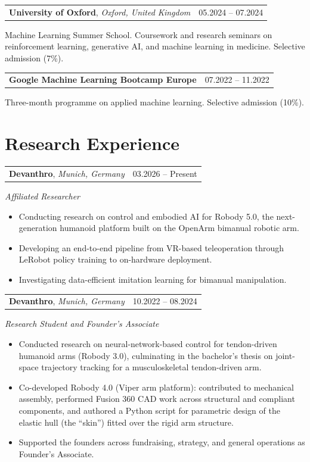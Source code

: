 \documentclass[11pt,a4paper]{article}
\makeatletter
\newcommand{\cventry}[3]{%
    \begin{tabularx}{\textwidth}{@{}Xr@{}}
        \textbf{#1}, \textit{#2} & #3 \\
    \end{tabularx}%
    \vspace{-0.35em}\par%
}
\newcommand{\cvitem}[2]{%
    \begin{tabularx}{\textwidth}{@{}Xr@{}}
        \textbf{#1} & #2 \\
    \end{tabularx}%
    \vspace{-0.35em}\par%
}
\makeatother
\begin{document}
\vspace{0.25em}
\cventry{University of Oxford}{Oxford, United Kingdom}{05.2024 -- 07.2024}
Machine Learning Summer School. Coursework and research seminars on reinforcement learning, generative AI, and machine learning in medicine. Selective admission (7\%).

\vspace{0.25em}
\cvitem{Google Machine Learning Bootcamp Europe}{07.2022 -- 11.2022}
Three-month programme on applied machine learning. Selective admission (10\%).

\section*{Research Experience}

\cventry{Devanthro}{Munich, Germany}{03.2026 -- Present}
\textit{Affiliated Researcher}
\begin{itemize}
    \item Conducting research on control and embodied AI for Robody 5.0, the next-generation humanoid platform built on the OpenArm bimanual robotic arm.
    \item Developing an end-to-end pipeline from VR-based teleoperation through LeRobot policy training to on-hardware deployment.
    \item Investigating data-efficient imitation learning for bimanual manipulation.
\end{itemize}

\vspace{0.25em}
\cventry{Devanthro}{Munich, Germany}{10.2022 -- 08.2024}
\textit{Research Student and Founder's Associate}
\begin{itemize}
    \item Conducted research on neural-network-based control for tendon-driven humanoid arms (Robody 3.0), culminating in the bachelor's thesis on joint-space trajectory tracking for a musculoskeletal tendon-driven arm.
    \item Co-developed Robody 4.0 (Viper arm platform): contributed to mechanical assembly, performed Fusion 360 CAD work across structural and compliant components, and authored a Python script for parametric design of the elastic hull (the ``skin'') fitted over the rigid arm structure.
    \item Supported the founders across fundraising, strategy, and general operations as Founder's Associate.
\end{itemize}
\end{document}
